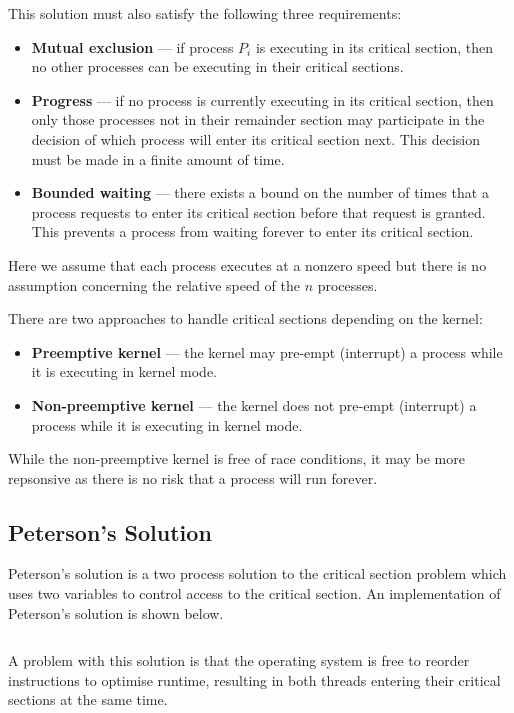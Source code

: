 \documentclass{article}
\begin{document}
This solution must also satisfy the following three requirements:
\begin{itemize}
    \item \textbf{Mutual exclusion} --- if process \(P_i\) is executing
          in its critical section, then no other processes can be
          executing in their critical sections.
    \item \textbf{Progress} --- if no process is currently executing in
          its critical section, then only those processes not in their
          remainder section may participate in the decision of which
          process will enter its critical section next. This decision must
          be made in a finite amount of time.
    \item \textbf{Bounded waiting} --- there exists a bound on the
          number of times that a process requests to enter its critical
          section before that request is granted. This prevents a
          process from waiting forever to enter its critical section.
\end{itemize}
Here we assume that each process executes at a nonzero speed but there
is no assumption concerning the relative speed of the \(n\) processes.

There are two approaches to handle critical sections depending on the
kernel:
\begin{itemize}
    \item \textbf{Preemptive kernel} --- the kernel may pre-empt
          (interrupt) a process while it is executing in kernel mode.
    \item \textbf{Non-preemptive kernel} --- the kernel does not
          pre-empt (interrupt) a process while it is executing in
          kernel mode.
\end{itemize}
While the non-preemptive kernel is free of race conditions, it may be
more repsonsive as there is no risk that a process will run forever.
\subsection{Peterson's Solution}
Peterson's solution is a two process solution to the critical section
problem which uses two variables to control access to the critical
section. An implementation of Peterson's solution is shown below.

\inputminted{c}{code/petersons_solution.c}

A problem with this solution is that the operating system is free to
reorder instructions to optimise runtime, resulting in both threads
entering their critical sections at the same time.
\end{document}
